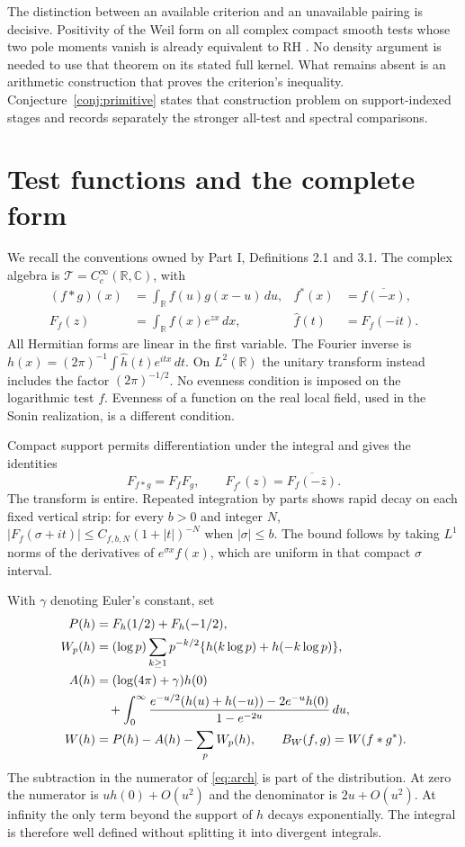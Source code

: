 \documentclass[11pt,letterpaper]{article}
\theoremstyle{definition}
\theoremstyle{remark}
\newcommand{\R}{\mathbb R}
\newcommand{\C}{\mathbb C}
\newcommand{\T}{\mathcal T}
\begin{document}
The distinction between an available criterion and an unavailable
pairing is decisive. Positivity of the Weil form on all complex
compact smooth tests whose two pole moments vanish is already
equivalent to RH \cite[Appendix C, Proposition 1]{CC20}. No density
argument is needed to use that theorem on its stated full kernel.
What remains absent is an arithmetic construction that proves the
criterion's inequality. Conjecture~\ref{conj:primitive} states that
construction problem on support-indexed stages and records separately
the stronger all-test and spectral comparisons.

\section{Test functions and the complete form}

We recall the conventions owned by Part I, Definitions 2.1 and 3.1.
The complex algebra is $\T=C_c^\infty(\R,\C)$, with
\begin{align}
 (f*g)(x)&=\int_\R f(u)g(x-u)\,du,
 &f^*(x)&=\overline{f(-x)},\label{eq:tests}\\
 F_f(z)&=\int_\R f(x)e^{zx}\,dx,
 &\widehat f(t)&=F_f(-it).\label{eq:transforms}
\end{align}
All Hermitian forms are linear in the first variable. The Fourier
inverse is $h(x)=(2\pi)^{-1}\int\widehat h(t)e^{itx}\,dt$.
On $L^2(\R)$ the unitary transform instead includes the factor
$(2\pi)^{-1/2}$. No evenness condition is imposed on the logarithmic
test $f$. Evenness of a function on the real local field, used in the
Sonin realization, is a different condition.

Compact support permits differentiation under the integral and gives
the identities
\begin{equation}
 F_{f*g}=F_fF_g,\qquad
 F_{f^*}(z)=\overline{F_f(-\overline z)}.
 \label{eq:transform-identities}
\end{equation}
The transform is entire. Repeated integration by parts shows rapid
decay on each fixed vertical strip: for every $b>0$ and integer $N$,
$|F_f(\sigma+it)|\le C_{f,b,N}(1+|t|)^{-N}$ when $|\sigma|\le b$.
The bound follows by taking $L^1$ norms of the derivatives of
$e^{\sigma x}f(x)$, which are uniform in that compact $\sigma$ interval.

With $\gamma$ denoting Euler's constant, set
\begin{align}
 P(h)&=F_h(1/2)+F_h(-1/2),\label{eq:poles}\\
 W_p(h)&=(\log p)\sum_{k\ge1}p^{-k/2}
       \{h(k\log p)+h(-k\log p)\},\label{eq:Wp}\\
 A(h)&=(\log(4\pi)+\gamma)h(0)\notag\\
 &\quad+\int_0^\infty
 \frac{e^{-u/2}(h(u)+h(-u))-2e^{-u}h(0)}{1-e^{-2u}}\,du,
 \label{eq:arch}\\
 W(h)&=P(h)-A(h)-\sum_p W_p(h),\qquad
 B_W(f,g)=W(f*g^*).\label{eq:Weil}
\end{align}
The subtraction in the numerator of \eqref{eq:arch} is part of the
distribution. At zero the numerator is $u h(0)+O(u^2)$ and the
denominator is $2u+O(u^2)$. At infinity the only term beyond the
support of $h$ decays exponentially. The integral is therefore
well defined without splitting it into divergent integrals.
\end{document}
